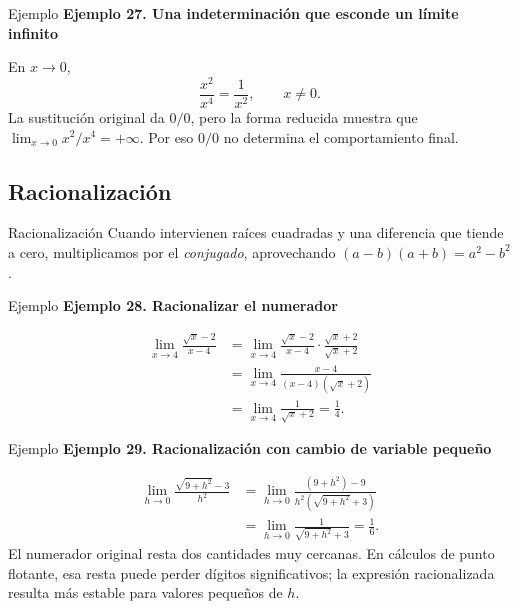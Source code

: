 \documentclass[12pt,aspectratio=169]{beamer}
\begin{document}
\begin{frame}[t,allowframebreaks]{Ejemplo}
{\color{azul}\bfseries Ejemplo 27. Una indeterminación que esconde un límite infinito}\par\medskip

En $x\to0$,
\[
 \frac{x^2}{x^4}=\frac1{x^2},\qquad x\ne0.
\]
La sustitución original da $0/0$, pero la forma reducida muestra que $\lim_{x\to0}x^2/x^4=+\infty$. Por eso $0/0$ no determina el comportamiento final.
\end{frame}


\subsection{Racionalización}

\begin{frame}[t,allowframebreaks]{Racionalización}
Cuando intervienen raíces cuadradas y una diferencia que tiende a cero, multiplicamos por el \emph{conjugado}, aprovechando $ (a-b)(a+b)=a^2-b^2$.
\end{frame}


\begin{frame}[t,allowframebreaks]{Ejemplo}
{\color{azul}\bfseries Ejemplo 28. Racionalizar el numerador}\par\medskip

\begin{align*}
\lim_{x\to4}\frac{\sqrt{x}-2}{x-4}
 &=\lim_{x\to4}\frac{\sqrt{x}-2}{x-4}\cdot\frac{\sqrt{x}+2}{\sqrt{x}+2}\\
 &=\lim_{x\to4}\frac{x-4}{(x-4)(\sqrt{x}+2)}\\
 &=\lim_{x\to4}\frac1{\sqrt{x}+2}=\boxed{\frac14}.
\end{align*}
\end{frame}


\begin{frame}[t,allowframebreaks]{Ejemplo}
{\color{azul}\bfseries Ejemplo 29. Racionalización con cambio de variable pequeño}\par\medskip

\begin{align*}
\lim_{h\to0}\frac{\sqrt{9+h^2}-3}{h^2}
 &=\lim_{h\to0}\frac{(9+h^2)-9}{h^2(\sqrt{9+h^2}+3)}\\
 &=\lim_{h\to0}\frac1{\sqrt{9+h^2}+3}=\boxed{\frac16}.
\end{align*}
El numerador original resta dos cantidades muy cercanas. En cálculos de punto flotante, esa resta puede perder dígitos significativos; la expresión racionalizada resulta más estable para valores pequeños de $h$.
\end{frame}
\end{document}
